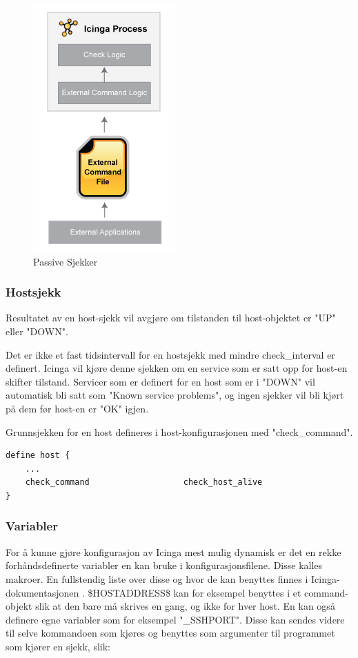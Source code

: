 \begin{figure}[H]
    \centering
    \includegraphics[scale=0.7]{img/passivechecks.png}
    \caption{Passive Sjekker}
    \label{passive_checks}
\end{figure}

\subsubsection{Hostsjekk}
Resultatet av en host-sjekk vil avgjøre om tilstanden til host-objektet er "UP" eller "DOWN". 

Det er ikke et fast tidsintervall for en hostsjekk med mindre check\_interval er definert. Icinga vil kjøre denne sjekken om en service som er satt opp for host-en skifter tilstand. Servicer som er definert for en host som er i "DOWN" vil automatisk bli satt som "Known service problems", og ingen sjekker vil bli kjørt på dem før host-en er "OK" igjen.

Grunnsjekken for en host defineres i host-konfigurasjonen med "check\_command".

\begin{lstlisting}
define host {
	...
	check_command                   check_host_alive
}
\end{lstlisting}

\subsubsection{Variabler}
For å kunne gjøre konfigurasjon av Icinga mest mulig dynamisk er det en rekke forhåndsdefinerte variabler en kan bruke i konfigurasjonsfilene. Disse kalles makroer. En fullstendig liste over disse og hvor de kan benyttes finnes i Icinga-dokumentasjonen \cite{icingamacro}. \$HOSTADDRESS\$ kan for eksempel benyttes i et command-objekt slik at den bare må skrives en gang, og ikke for hver host. En kan også definere egne variabler som for eksempel "\_SSHPORT". Disse kan sendes videre til selve kommandoen som kjøres og benyttes som argumenter til programmet som kjører en sjekk, slik:

